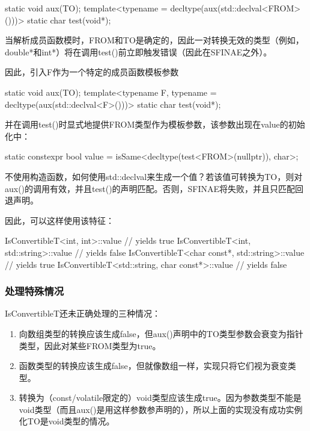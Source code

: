 \begin{cpp}
static void aux(TO);
template<typename = decltype(aux(std::declval<FROM>()))>
	static char test(void*);
\end{cpp}

当解析成员函数模时，FROM和TO是确定的，因此一对转换无效的类型（例如，double*和int*）将在调用test()前立即触发错误（因此在SFINAE之外）。

因此，引入F作为一个特定的成员函数模板参数

\begin{cpp}
static void aux(TO);
template<typename F, typename = decltype(aux(std::declval<F>()))>
	static char test(void*);
\end{cpp}

并在调用test()时显式地提供FROM类型作为模板参数，该参数出现在value的初始化中：

\begin{cpp}
static constexpr bool value
	= isSame<decltype(test<FROM>(nullptr)), char>;
\end{cpp}

不使用构造函数，如何使用std::declval来生成一个值？若该值可转换为TO，则对aux()的调用有效，并且test()的声明匹配。否则，SFINAE将失败，并且只匹配回退声明。

因此，可以这样使用该特征：

\begin{cpp}
IsConvertibleT<int, int>::value // yields true
IsConvertibleT<int, std::string>::value // yields false
IsConvertibleT<char const*, std::string>::value // yields true
IsConvertibleT<std::string, char const*>::value // yields false
\end{cpp}

\subsubsection{处理特殊情况}

IsConvertibleT还未正确处理的三种情况：

\begin{enumerate}
\item
向数组类型的转换应该生成false，但aux()声明中的TO类型参数会衰变为指针类型，因此对某些FROM类型为true。

\item
函数类型的转换应该生成false，但就像数组一样，实现只将它们视为衰变类型。

\item
转换为（const/volatile限定的）void类型应该生成true。因为参数类型不能是void类型（而且aux()是用这样参数参声明的），所以上面的实现没有成功实例化TO是void类型的情况。
\end{enumerate}

